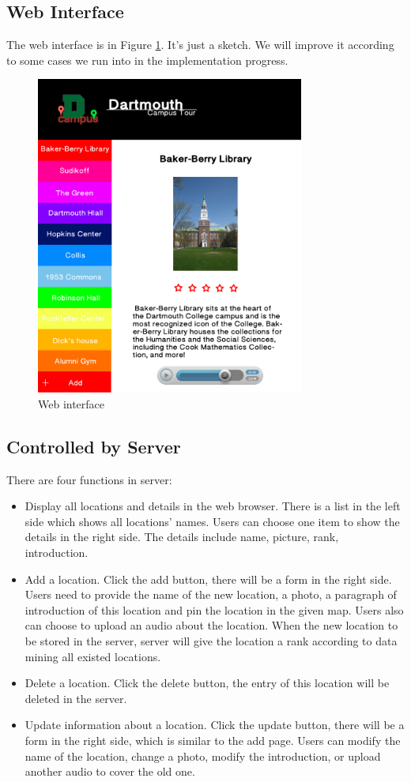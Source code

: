 \documentclass{article}
\begin{document}
\subsection{Web Interface}

The web interface is in Figure \ref{F:dcserver}. It’s just a sketch. We will improve it according to some cases we run into in the implementation progress.

\begin{figure}[h!]   
\centering
\includegraphics[width = 250pt]{figures/DCampusTourServer.jpg}
\caption{Web interface}
\label{F:dcserver}
\end{figure}

\subsection{Controlled by Server}
There are four functions in server:
\begin{itemize}
\item
Display all locations and details in the web browser. There is a list in the left side which shows all locations’ names. Users can choose one item to show the details in the right side. The details include name, picture, rank, introduction.

\item
Add a location. Click the add button, there will be a form in the right side. Users need to provide the name of the new location, a photo,  a paragraph of introduction of this location and pin the location in the given map. Users also can choose to upload an audio about the location. When the new location to be stored in the server, server will give the location a rank according to data mining all existed locations.

\item
Delete a location. Click the delete button, the entry of this location will be deleted in the server. 

\item
Update information about a location. Click the update button, there will be a form in the right side, which is similar to the add page. Users can modify the name of the location, change a photo, modify the introduction, or upload another audio to cover the old one.
\end{itemize}
\end{document}

